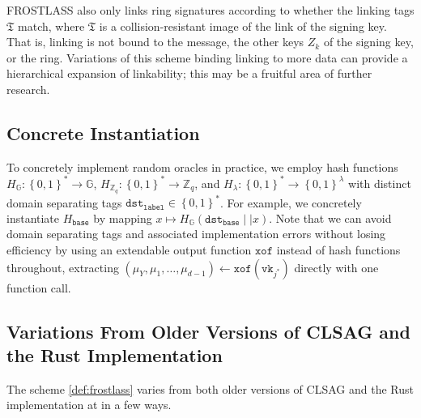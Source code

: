 \documentclass[11pt]{article}
\theoremstyle{definition}
\newcommand{\G}{\mathbb{G}}
\newcommand{\vk}{\texttt{vk}}
\newcommand{\dst}{\texttt{dst}}
\newcommand{\bitstrings}{\left\{0,1\right\}^*}
\newcommand{\Zq}{\mathbb{Z}_q}
\newcommand{\secpar}{\lambda}
\begin{document}
FROSTLASS also only links ring signatures according to whether the linking tags $\mathfrak{T}$ match, where $\mathfrak{T}$ is a collision-resistant image of the link of the signing key. That is, linking is not bound to the message, the other keys $Z_k$ of the signing key, or the ring. Variations of this scheme binding linking to more data can provide a hierarchical expansion of linkability; this may be a fruitful area of further research.


\subsection{Concrete Instantiation}\label{sec:concrete_instantiation}


To concretely implement random oracles in practice, we employ hash functions $H_{\G}: \bitstrings \to \G$, $H_{\Zq}:\bitstrings \to \Zq$, and $H_{\secpar}:\bitstrings \to \left\{0,1\right\}^\secpar$ with distinct domain separating tags $\dst_{\texttt{label}} \in \bitstrings$. For example, we concretely instantiate $H_{\texttt{base}}$ by mapping $x \mapsto H_{\G}(\dst_{\texttt{base}} \mid \mid x)$. Note that we can avoid domain separating tags and associated implementation errors without losing efficiency by using an extendable output function $\texttt{xof}$ instead of hash functions throughout, extracting $(\mu_Y, \mu_1, \ldots, \mu_{d-1}) \leftarrow \texttt{xof}(\vk_{j^*})$ directly with one function call.

\subsection{Variations From Older Versions of CLSAG and the Rust Implementation}\label{sec:variations_from_implem}

The scheme \cref{def:frostlass} varies from both older versions of CLSAG and the Rust implementation at \cite{SeraiRepo} in a few ways.
\end{document}
